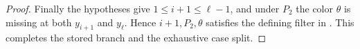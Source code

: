 \begin{proof}
Finally the hypotheses give \(1\le i+1\le\ell-1\), and under \(P_2\) the
color \(\theta\) is missing at both \(y_{i+1}\) and \(y_\ell\).  Hence
\(i+1,P_2,\theta\) satisfies the defining filter in
.  This completes the
stored branch and the exhaustive case split.
\end{proof}
